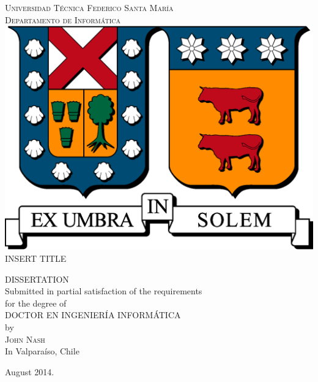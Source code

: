 \thispagestyle{empty}
\vspace{1.5in}
\begin{center}
{\textsc{Universidad T\'ecnica Federico Santa Mar\'ia}}\\
{\textsc{Departamento de Inform\'atica}}\\
\medskip
\includegraphics[scale=0.3]{img/logo_usm.eps}
\bigskip
\bigskip
\bigskip
\bigskip \\
{\textsc{\Large{{INSERT TITLE}}}}\\%

\bigskip
\bigskip
\bigskip
\bigskip
\bigskip 

{\MakeUppercase{Dissertation}\\
\bigskip
\bigskip
Submitted in partial satisfaction of the requirements\\
for the degree of\\
\bigskip
\bigskip
\MakeUppercase{Doctor en Ingenier\'ia Inform\'atica}\\
\bigskip
\bigskip
by\\
\bigskip
{\textsc{\large{John Nash}}}\\
\bigskip
\bigskip
In Valpara\'iso, Chile}
\end{center}

\begin{center}
{\normalsize August 2014.}
\end{center}

\pagebreak

